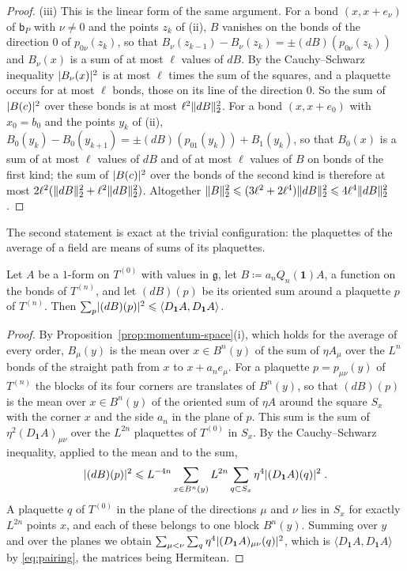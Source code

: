 \documentclass[11pt]{preprint}
\newcommand{\id}{\mathbf 1}
\DeclarePairedDelimiter{\abs}{\lvert}{\rvert}
\DeclarePairedDelimiter{\norm}{\lVert}{\rVert}
\numberwithin{equation}{section}
\begin{document}
\begin{proof}
(iii) This is the linear form of the same argument. For a bond $(x, x + e_\nu)$ of $\mathsf b_P$ with $\nu \neq 0$ and the points $z_k$ of (ii), $B$ vanishes on the bonds of the direction $0$ of $p_{0\nu}(z_k)$, so that $B_\nu(z_{k-1}) - B_\nu(z_k) = \pm(dB)(p_{0\nu}(z_k))$ and $B_\nu(x)$ is a sum of at most $\ell$ values of $dB$. By the Cauchy--Schwarz inequality $\abs{B_\nu(x)}^2$ is at most $\ell$ times the sum of the squares, and a plaquette occurs for at most $\ell$ bonds, those on its line of the direction $0$. So the sum of $\abs{B(c)}^2$ over these bonds is at most $\ell^2\norm{dB}_2^2$. For a bond $(x, x + e_0)$ with $x_0 = b_0$ and the points $y_k$ of (ii), $B_0(y_k) - B_0(y_{k+1}) = \pm(dB)(p_{01}(y_k)) + B_1(y_k)$, so that $B_0(x)$ is a sum of at most $\ell$ values of $dB$ and of at most $\ell$ values of $B$ on bonds of the first kind; the sum of $\abs{B(c)}^2$ over the bonds of the second kind is therefore at most $2\ell^2(\norm{dB}_2^2 + \ell^2\norm{dB}_2^2)$. Altogether $\norm B_2^2 \leqslant (3\ell^2 + 2\ell^4)\norm{dB}_2^2 \leqslant 4\ell^4\norm{dB}_2^2$.
\end{proof}

The second statement is exact at the trivial configuration: the plaquettes of the average of a field are means of sums of its plaquettes.

\begin{lemma}\label{lem:averaged-plaquettes}
Let $A$ be a $1$-form on $T^{(0)}$ with values in $\mathfrak g$, let $B \coloneqq a_nQ_n(\id)A$, a function on the bonds of $T^{(n)}$, and let $(dB)(p)$ be its oriented sum around a plaquette $p$ of $T^{(n)}$. Then $\sum_p\abs{(dB)(p)}^2 \leqslant \langle D_{\id}A, D_{\id}A\rangle$.
\end{lemma}

\begin{proof}
By Proposition~\ref{prop:momentum-space}(i), which holds for the average of every order, $B_\mu(y)$ is the mean over $x \in B^n(y)$ of the sum of $\eta A_\mu$ over the $L^n$ bonds of the straight path from $x$ to $x + a_ne_\mu$. For a plaquette $p = p_{\mu\nu}(y)$ of $T^{(n)}$ the blocks of its four corners are translates of $B^n(y)$, so that $(dB)(p)$ is the mean over $x \in B^n(y)$ of the oriented sum of $\eta A$ around the square $S_x$ with the corner $x$ and the side $a_n$ in the plane of $p$. This sum is the sum of $\eta^2(D_{\id}A)_{\mu\nu}$ over the $L^{2n}$ plaquettes of $T^{(0)}$ in $S_x$. By the Cauchy--Schwarz inequality, applied to the mean and to the sum,
\[
    \abs{(dB)(p)}^2 \leqslant L^{-4n}\sum_{x \in B^n(y)}L^{2n}\sum_{q \subset S_x}\eta^4\abs{(D_{\id}A)(q)}^2\;.
\]
A plaquette $q$ of $T^{(0)}$ in the plane of the directions $\mu$ and $\nu$ lies in $S_x$ for exactly $L^{2n}$ points $x$, and each of these belongs to one block $B^n(y)$. Summing over $y$ and over the planes we obtain $\sum_{\mu < \nu}\sum_q\eta^4\abs{(D_{\id}A)_{\mu\nu}(q)}^2$, which is $\langle D_{\id}A, D_{\id}A\rangle$ by \eqref{eq:pairing}, the matrices being Hermitean.
\end{proof}
\end{document}
